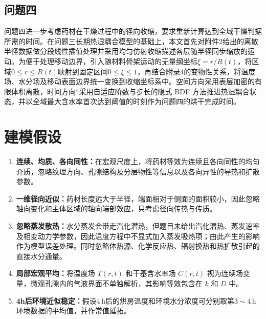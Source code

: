 \documentclass[withoutpreface,bwprint]{cumcmthesis}
\begin{document}
\subsection{问题四}

问题四进一步考虑药材在干燥过程中的径向收缩，要求重新计算达到全域干燥判据所需的时间。在问题三长期热湿耦合模型的基础上，本文首先对附件2给出的离散半径数据做分段线性插值处理并采用均匀仿射收缩描述各层随半径同步缩放的运动。为便于处理移动边界，引入随材料骨架运动的无量纲坐标$\xi=r/R(t)$，将区域$0\le r\le R(t)$映射到固定区间$0\le\xi\le1$，再结合附录4的变物性关系，将温度场、水分场及移动表面边界统一变换到收缩坐标系中。空间方向采用表层加密的有限体积离散，时间方向“采用自适应阶数与步长的隐式 BDF 方法推进热湿耦合状态，并以全域最大含水率首次达到阈值的时刻作为问题四的烘干完成时间。


\section{建模假设}
\begin{enumerate}[label=\arabic*.,leftmargin=2em,itemsep=0pt,topsep=0pt]
  \item \textbf{连续、均质、各向同性：}在宏观尺度上，将药材等效为连续且各向同性的均匀介质，忽略纹理方向、孔隙结构及分层物性等信息以及各向异性的导热和扩散参数。
  \item \textbf{一维径向近似：}药材长度远大于半径，端面相对于侧面的面积较小，因此忽略轴向变化和主体区域的轴向端部效应，只考虑径向传热与传质。
  \item \textbf{忽略蒸发散热：}水分蒸发会带走汽化潜热，但题目未给出汽化潜热、蒸发速率及相变动力学参数，因此温度方程中不显式加入蒸发吸热项；由此产生的影响作为模型误差处理。同时忽略体热源、化学反应热、辐射换热和热扩散引起的直接水分通量。
  \item \textbf{局部宏观平均：}将温度场 $T(r,t)$ 和干基含水率场 $C(r,t)$ 视为连续场变量，微观孔隙内的气液界面不单独解析，其影响等效包含在 $k$ 和 $D$ 中。
  \item \textbf{4h后环境近似稳定：}假设$4\,\mathrm{h}$后的烘房温度和环境水分浓度可分别取第$3\sim4\,\mathrm{h}$环境数据的平均值，并作常值延拓。

\end{enumerate}
\end{document}
